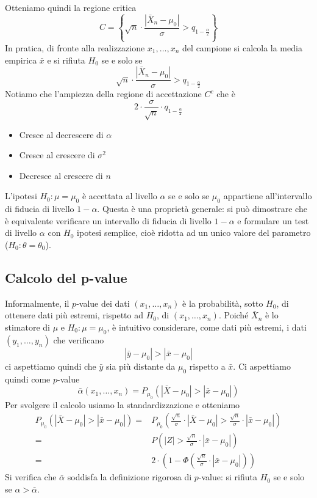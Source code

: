 Otteniamo quindi la regione critica
\[
	C = \left\{ \sqrt{n} \cdot \frac{|\bar{X}_n -
		\mu_0|}{\sigma} > q_{1 - \frac{\alpha}{2}} \right\}
\]
In pratica, di fronte alla realizzazione $x_1, \dots, x_n$ del campione si calcola la media
empirica $\bar{x}$ e si rifiuta $H_0$ se e solo se
\[ \sqrt{n} \cdot \frac{|\bar{X}_n - \mu_0|}{\sigma} > q_{1 - \frac{\alpha}{2}}  \]
Notiamo che l'ampiezza della regione di accettazione $C^c$ che è
\[ 2 \cdot \frac{\sigma}{\sqrt{n}} \cdot q_{1 - \frac{\alpha}{2}} \]
\begin{itemize}
	\item Cresce al decrescere di $\alpha$
	\item Cresce al crescere di $\sigma^2$
	\item Decresce al crescere di $n$
\end{itemize}

\begin{observation}
	L'ipotesi $H_0: \mu = \mu_0$ è accettata al livello $\alpha$ se e solo se $\mu_0$ appartiene
	all'intervallo di fiducia di livello $1-\alpha$. Questa è una proprietà generale: si può
	dimostrare che è equivalente verificare un intervallo di fiducia di livello $1-\alpha$ e
	formulare un test di livello $\alpha$ con $H_0$ ipotesi semplice, cioè ridotta ad un unico
	valore del parametro ($H_0 : \theta = \theta_0$).
\end{observation}

\subsection{Calcolo del p-value}
Informalmente, il $p$-value dei dati $(x_1, \dots, x_n)$ è la probabilità, sotto $H_0$, di
ottenere dati più estremi, rispetto ad $H_0$, di $(x_1, \dots, x_n)$. Poiché $\bar{X}_n$ è
lo stimatore di $\mu$ e $H_0: \mu = \mu_0$, è intuitivo considerare, come dati più estremi, i dati
$(y_1, \dots, y_n)$ che verificano
\[ |\bar{y} - \mu_0| > |\bar{x} - \mu_0| \]
ci aspettiamo quindi che $\bar{y}$ sia più distante da $\mu_0$ rispetto a $\bar{x}$. Ci
aspettiamo quindi come $p$-value
\[
	\bar{\alpha} (x_1, \dots, x_n) =
	P_{\mu_0} (|\bar{X} - \mu_0| > |\bar{x} - \mu_0|)
\]
Per svolgere il calcolo usiamo la standardizzazione e otteniamo
\begin{align*}
	P_{\mu_0} (|\bar{X} - \mu_0| > |\bar{x} - \mu_0|)
	= & P_{\mu_0} \left( \frac{\sqrt{n}}{\sigma} \cdot |\bar{X} - \mu_0| >
	\frac{\sqrt{n}}{\sigma} \cdot |\bar{x} - \mu_0| \right)                    \\
	= & P \left( |Z| > \frac{\sqrt{n}}{\sigma} \cdot |\bar{x} - \mu_0| \right) \\
	= & 2 \cdot \left(1 - \Phi \left(\frac{\sqrt{n}}{\sigma} \cdot
		|\bar{x} - \mu_0| \right) \right)
\end{align*}
Si verifica che $\bar{\alpha}$ soddisfa la definizione rigorosa di $p$-value: si rifiuta $H_0$
se e solo se $\alpha > \bar{\alpha}$.

